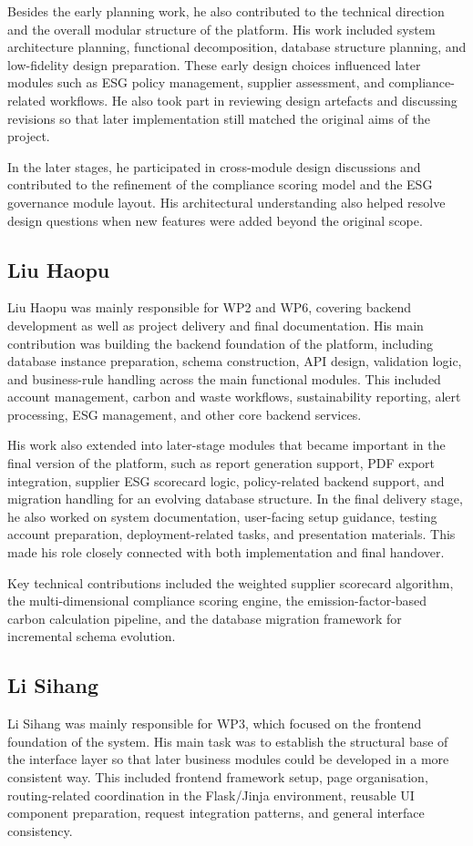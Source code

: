 \documentclass[11pt,a4paper]{article}
\begin{document}
Besides the early planning work, he also contributed to the technical direction and the overall modular structure of the platform. His work included system architecture planning, functional decomposition, database structure planning, and low-fidelity design preparation. These early design choices influenced later modules such as ESG policy management, supplier assessment, and compliance-related workflows. He also took part in reviewing design artefacts and discussing revisions so that later implementation still matched the original aims of the project.

In the later stages, he participated in cross-module design discussions and contributed to the refinement of the compliance scoring model and the ESG governance module layout. His architectural understanding also helped resolve design questions when new features were added beyond the original scope.

\subsection{Liu Haopu}
Liu Haopu was mainly responsible for WP2 and WP6, covering backend development as well as project delivery and final documentation. His main contribution was building the backend foundation of the platform, including database instance preparation, schema construction, API design, validation logic, and business-rule handling across the main functional modules. This included account management, carbon and waste workflows, sustainability reporting, alert processing, ESG management, and other core backend services.

His work also extended into later-stage modules that became important in the final version of the platform, such as report generation support, PDF export integration, supplier ESG scorecard logic, policy-related backend support, and migration handling for an evolving database structure. In the final delivery stage, he also worked on system documentation, user-facing setup guidance, testing account preparation, deployment-related tasks, and presentation materials. This made his role closely connected with both implementation and final handover.

Key technical contributions included the weighted supplier scorecard algorithm, the multi-dimensional compliance scoring engine, the emission-factor-based carbon calculation pipeline, and the database migration framework for incremental schema evolution.

\subsection{Li Sihang}
Li Sihang was mainly responsible for WP3, which focused on the frontend foundation of the system. His main task was to establish the structural base of the interface layer so that later business modules could be developed in a more consistent way. This included frontend framework setup, page organisation, routing-related coordination in the Flask/Jinja environment, reusable UI component preparation, request integration patterns, and general interface consistency.
\end{document}

